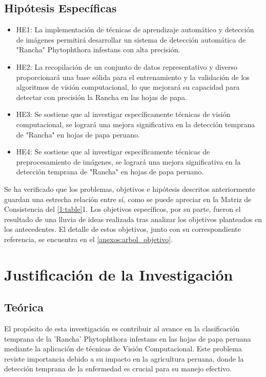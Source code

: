 \subsection{Hipótesis Específicas}
\newcommand{\Hone}{
La implementación de técnicas de aprendizaje automático y detección de imágenes permitirá desarrollar un sistema de detección automática de "Rancha" Phytophthora infestans con alta precisión.
}
\newcommand{\Htwo}{
La recopilación de un conjunto de datos representativo y diverso proporcionará una base sólida para el entrenamiento y la validación de los algoritmos de visión computacional, lo que mejorará su capacidad para detectar con precisión la Rancha en las hojas de papa.
}
\newcommand{\Hthree}{
Se sostiene que al investigar específicamente técnicas de visión computacional, se logrará una mejora significativa en la detección temprana de "Rancha" en hojas de papa peruano.
}
\newcommand{\Hfour}{
Se sostiene que al investigar específicamente técnicas de preprocesamiento de imágenes, se logrará una mejora significativa en la detección temprana de "Rancha" en hojas de papa peruano.
}

\begin{itemize}
	\item HE1: \Hone
	\item HE2: \Htwo
	\item HE3: \Hthree
	\item HE4: \Hfour
\end{itemize}
Se ha verificado que los problemas, objetivos e hipótesis descritos anteriormente guardan una estrecha relación entre sí, como se puede apreciar en la Matriz de Consistencia del \ref{1:table}1.
Los objetivos específicos, por su parte, fueron el resultado de una lluvia de ideas realizada tras analizar los objetivos planteados en los antecedentes. El detalle de estos objetivos, junto con su correspondiente referencia, se encuentra en el \ref{anexos:arbol_objetivo}.


\section{Justificación de la Investigación}

\subsection{Teórica}
El propósito de esta investigación es contribuir al avance en la clasificación temprana de la 'Rancha' Phytophthora infestans en las hojas de papa peruana mediante la aplicación de técnicas de Visión Computacional. Este problema reviste importancia debido a su impacto en la agricultura peruana, donde la detección temprana de la enfermedad es crucial para su manejo efectivo.

